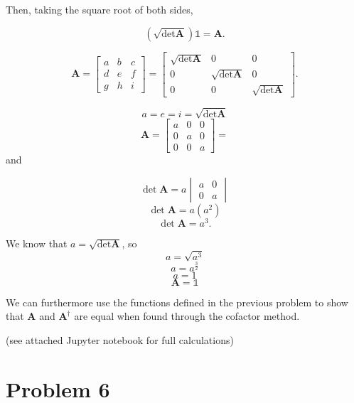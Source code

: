\documentclass{article}
\begin{document}
Then, taking the square root of both sides,

$$ \left(\sqrt{\det{\textbf{A}}}\right)\mathbb{1} = \textbf{A} .$$

$$ \textbf{A} = \begin{bmatrix} a & b & c \\
                                d & e & f \\
                                g & h & i \end{bmatrix} =
                \begin{bmatrix} \sqrt{\det{\textbf{A}}} & 0 & 0 \\
                                0 & \sqrt{\det{\textbf{A}}} & 0 \\
                                0 & 0 & \sqrt{\det{\textbf{A}}} \end{bmatrix}. $$
                
$$ a = e = i = \sqrt{\det{\textbf{A}}} $$
$$ \textbf{A} = \begin{bmatrix} a & 0 & 0 \\
                                0 & a & 0 \\
                                0 & 0 & a \end{bmatrix} = $$
and

$$ \det{\textbf{A}} = a \begin{vmatrix} a & 0 \\ 0 & a \end{vmatrix} $$
$$ \det{\textbf{A}} = a (a^2) $$
$$ \det{\textbf{A}} = a^3 .$$

We know that $a = \sqrt{\det{\textbf{A}}}$, so
$$ a = \sqrt{a^3} $$
$$ a = a^{\frac{3}{2}} $$
$$ a = 1 $$
$$\boxed{ \textbf{A} = \mathbb{1} }$$

We can furthermore use the functions defined in the previous problem to show that $\textbf{A}$ and  $\textbf{A}^{\dagger}$ are equal when found through the cofactor method.

(see attached Jupyter notebook for full calculations)




\section*{Problem 6}




\end{document}
